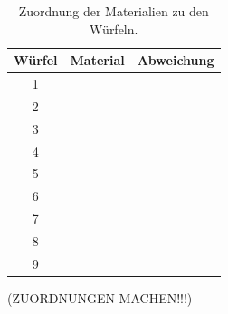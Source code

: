 \begin{table}[htp]
	\begin{center}
    \caption{Zuordnung der Materialien zu den Würfeln.}
    \label{tab:ergebnisse2}
		\begin{tabular}{ccc}
		\toprule
			{Würfel} & {Material}  & {Abweichung} \\
			\midrule
			1 &  & \\
			2 &  & \\
			3 &  & \\
			4 &  & \\
			5 &  & \\
			6 &  & \\
			7 &  & \\
			8 &  & \\
			9 &  & \\
		\bottomrule
		\end{tabular}
	\end{center}
\end{table}

(ZUORDNUNGEN MACHEN!!!)
